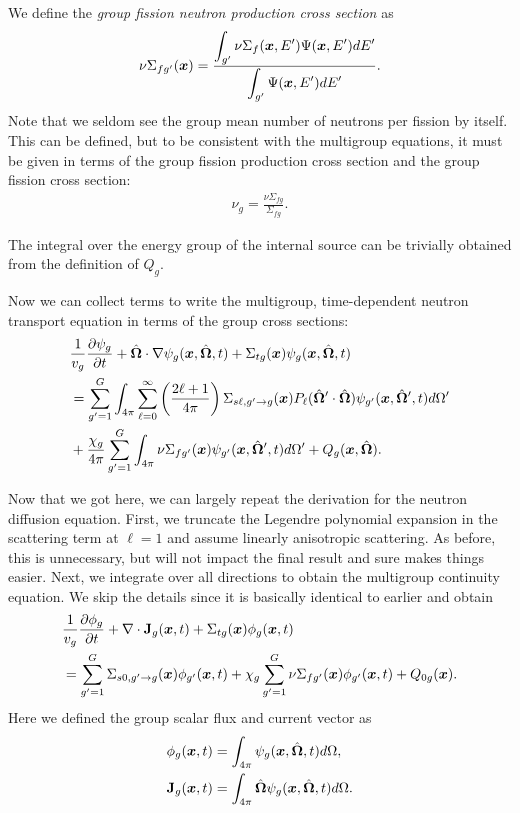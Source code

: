 We define the \emph{group fission neutron production cross section} as
\begin{align}
  \nu\Sigma_{fg'}(\bm{x}) = \dfrac{ \displaystyle\int_{g'} \nu\Sigma_f(\bm{x},E') \Psi(\bm{x},E') dE' }{ \displaystyle\int_{g'} \Psi(\bm{x},E') dE'} .
\end{align}
Note that we seldom see the group mean number of neutrons per fission by itself. This can be defined, but to be consistent with the multigroup equations, it must be given in terms of the group fission production cross section and the group fission cross section:
\begin{align}
  \nu_g = \frac{ \nu\Sigma_{fg} }{ \Sigma_{fg} } .
\end{align}

The integral over the energy group of the internal source can be trivially obtained from the definition of $Q_g$. 

Now we can collect terms to write the multigroup, time-dependent neutron transport equation in terms of the group cross sections:
\begin{align}
  &\frac{1}{v_g} \frac{ \partial {\psi_g} }{ \partial {t} } + \hat{\mathbf{\Omega}} \cdot \nabla \psi_g(\bm{x},\hat{\mathbf{\Omega}},t) + \Sigma_{tg}(\bm{x}) \psi_g(\bm{x},\hat{\mathbf{\Omega}},t) \nonumber \\*
  &= \sum_{g'=1}^G \int_{4\pi} \sum_{\ell = 0}^\infty  \left( \frac{2\ell + 1}{4\pi} \right)  \Sigma_{s\ell,g' \rightarrow g}(\bm{x}) P_\ell(\hat{\mathbf{\Omega}}' \cdot \hat{\mathbf{\Omega}}) \psi_{g'}(\bm{x},\hat{\mathbf{\Omega}}',t) d\Omega' \nonumber \\*
  &+ \frac{\chi_g}{4\pi} \sum_{g'=1}^G  \int_{4\pi} \nu\Sigma_{fg'}(\bm{x}) \psi_{g'}(\bm{x},\hat{\mathbf{\Omega}}',t) d\Omega' + Q_g(\bm{x},\hat{\mathbf{\Omega}}) .
\end{align}

Now that we got here, we can largely repeat the derivation for the neutron diffusion equation. First, we truncate the Legendre polynomial expansion in the scattering term at $\ell = 1$ and assume linearly anisotropic scattering. As before, this is unnecessary, but will not impact the final result and sure makes things easier. Next, we integrate over all directions to obtain the multigroup continuity equation. We skip the details since it is basically identical to earlier and obtain
\begin{align}
  &\frac{1}{v_g} \frac{ \partial {\phi_g} }{ \partial {t} } + \nabla \cdot \mathbf{J}_g(\bm{x},t) + \Sigma_{tg}(\bm{x}) \phi_g(\bm{x},t) \nonumber \\*
  &= \sum_{g'=1}^G  \Sigma_{s0,g' \rightarrow g}(\bm{x}) \phi_{g'}(\bm{x},t) + \chi_g \sum_{g'=1}^G   \nu\Sigma_{fg'}(\bm{x}) \phi_{g'}(\bm{x},t) + Q_{0g}(\bm{x}) .
\end{align}
Here we defined the group scalar flux and current vector as
\begin{subequations}
\begin{align}
  \phi_g(\bm{x},t) &= \int_{4\pi} \psi_g(\bm{x},\hat{\mathbf{\Omega}},t) d\Omega , \\
  \mathbf{J}_g(\bm{x},t) &= \int_{4\pi} \hat{\mathbf{\Omega}} \psi_g(\bm{x},\hat{\mathbf{\Omega}},t) d\Omega  .
\end{align}
\end{subequations}


